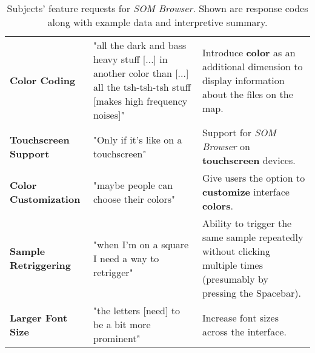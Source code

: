 \begin{table}[!htb]
{\begin{tabular}{ p{4.0cm} p{4.75cm} p{4.75cm} }
    \\
    \textbf{Color Coding}
    &
    "all the dark and bass heavy stuff [...] in another color than [...] all the
    tsh-tsh-tsh stuff [makes high frequency noises]"
    &
    Introduce \textbf{color} as an additional dimension to display information
    about the files on the map.
    \\
    \textbf{Touchscreen Support}
    &
    "Only if it's like on a touchscreen"
    &
    Support for \textit{SOM Browser} on \textbf{touchscreen} devices.
    \\
    \textbf{Color Customization}
    &
    "maybe people can choose their colors"
    &
    Give users the option to \textbf{customize} interface \textbf{colors}.
    \\
    \textbf{Sample Retriggering}
    &
    "when I'm on a square I need a way to retrigger"
    &
    Ability to trigger the same sample repeatedly without clicking multiple
    times (presumably by pressing the Spacebar).
    \\
    \textbf{Larger Font Size}
    &
    "the letters [need] to be a bit more prominent"
    &
    Increase font sizes across the interface.
    \\
  \end{tabular}}
  \caption[SOM Browser: Feature Requests]{Subjects' feature requests for
  \textit{SOM Browser}. Shown are response codes along with example data and
  interpretive summary.}
  \label{table:responses_feature_requests}
\end{table}
